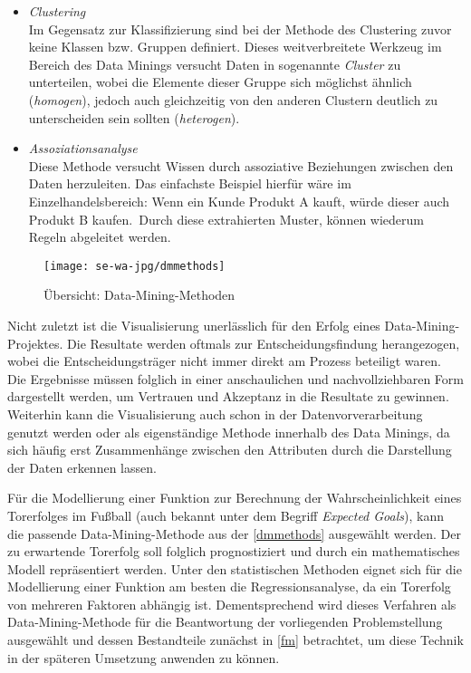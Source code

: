 \begin{itemize}
\item \textit{Clustering}
\\ Im Gegensatz zur Klassifizierung sind bei der Methode des Clustering zuvor keine Klassen bzw. Gruppen definiert. Dieses weitverbreitete Werkzeug im Bereich des Data Minings versucht Daten in sogenannte \textit{Cluster} zu unterteilen, wobei die Elemente dieser Gruppe sich möglichst ähnlich (\textit{homogen}), jedoch auch gleichzeitig von den anderen Clustern deutlich zu unterscheiden sein sollten (\textit{heterogen}).

\item \textit{Assoziationsanalyse}
\\ Diese Methode versucht Wissen durch assoziative Beziehungen zwischen den Daten herzuleiten. Das einfachste Beispiel hierfür wäre im Einzelhandelsbereich: \glqq Wenn ein Kunde Produkt A kauft, würde dieser auch Produkt B kaufen.\grqq~Durch diese extrahierten Muster, können wiederum Regeln abgeleitet werden.
\end{itemize}

\begin{sidewaysfigure}
\centering
\texttt{[image: se-wa-jpg/dmmethods]}
\caption[Übersicht: Data-Mining-Methoden]{Übersicht: Data-Mining-Methoden\protect\footnotemark}
\label{dmmethods}	
\end{sidewaysfigure}

Nicht zuletzt ist die Visualisierung unerlässlich für den Erfolg eines Data-Mining-Projektes. Die Resultate werden oftmals zur Entscheidungsfindung herangezogen, wobei die Entscheidungsträger nicht immer direkt am Prozess beteiligt waren. Die Ergebnisse müssen folglich in einer anschaulichen und nachvollziehbaren Form dargestellt werden, um Vertrauen und Akzeptanz in die Resultate zu gewinnen. Weiterhin kann die Visualisierung auch schon in der Datenvorverarbeitung genutzt werden oder als eigenständige Methode innerhalb des Data Minings, da sich häufig erst Zusammenhänge zwischen den Attributen durch die Darstellung der Daten erkennen lassen.

Für die Modellierung einer Funktion zur Berechnung der Wahrscheinlichkeit eines Torerfolges im Fußball (auch bekannt unter dem Begriff \textit{Expected Goals}), kann die passende Data-Mining-Methode aus der \vref{dmmethods} ausgewählt werden. Der zu erwartende Torerfolg soll folglich prognostiziert und durch ein mathematisches Modell repräsentiert werden. Unter den statistischen Methoden eignet sich für die Modellierung einer Funktion am besten die Regressionsanalyse, da ein Torerfolg von mehreren Faktoren abhängig ist. Dementsprechend wird dieses Verfahren als Data-Mining-Methode für die Beantwortung der vorliegenden Problemstellung ausgewählt und dessen Bestandteile zunächst in \vref{fm} betrachtet, um diese Technik in der späteren Umsetzung anwenden zu können.	